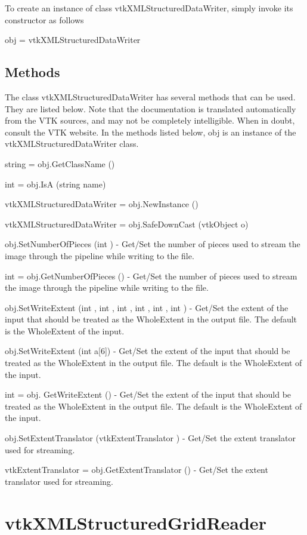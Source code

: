 To create an instance of class vtk\-X\-M\-L\-Structured\-Data\-Writer, simply invoke its constructor as follows \begin{DoxyVerb}  obj = vtkXMLStructuredDataWriter
\end{DoxyVerb}
 \hypertarget{vtkwidgets_vtkxyplotwidget_Methods}{}\subsection{Methods}\label{vtkwidgets_vtkxyplotwidget_Methods}
The class vtk\-X\-M\-L\-Structured\-Data\-Writer has several methods that can be used. They are listed below. Note that the documentation is translated automatically from the V\-T\-K sources, and may not be completely intelligible. When in doubt, consult the V\-T\-K website. In the methods listed below, {\ttfamily obj} is an instance of the vtk\-X\-M\-L\-Structured\-Data\-Writer class. 
\begin{DoxyItemize}
\item {\ttfamily string = obj.\-Get\-Class\-Name ()}  
\item {\ttfamily int = obj.\-Is\-A (string name)}  
\item {\ttfamily vtk\-X\-M\-L\-Structured\-Data\-Writer = obj.\-New\-Instance ()}  
\item {\ttfamily vtk\-X\-M\-L\-Structured\-Data\-Writer = obj.\-Safe\-Down\-Cast (vtk\-Object o)}  
\item {\ttfamily obj.\-Set\-Number\-Of\-Pieces (int )} -\/ Get/\-Set the number of pieces used to stream the image through the pipeline while writing to the file.  
\item {\ttfamily int = obj.\-Get\-Number\-Of\-Pieces ()} -\/ Get/\-Set the number of pieces used to stream the image through the pipeline while writing to the file.  
\item {\ttfamily obj.\-Set\-Write\-Extent (int , int , int , int , int , int )} -\/ Get/\-Set the extent of the input that should be treated as the Whole\-Extent in the output file. The default is the Whole\-Extent of the input.  
\item {\ttfamily obj.\-Set\-Write\-Extent (int a\mbox{[}6\mbox{]})} -\/ Get/\-Set the extent of the input that should be treated as the Whole\-Extent in the output file. The default is the Whole\-Extent of the input.  
\item {\ttfamily int = obj. Get\-Write\-Extent ()} -\/ Get/\-Set the extent of the input that should be treated as the Whole\-Extent in the output file. The default is the Whole\-Extent of the input.  
\item {\ttfamily obj.\-Set\-Extent\-Translator (vtk\-Extent\-Translator )} -\/ Get/\-Set the extent translator used for streaming.  
\item {\ttfamily vtk\-Extent\-Translator = obj.\-Get\-Extent\-Translator ()} -\/ Get/\-Set the extent translator used for streaming.  
\end{DoxyItemize}\hypertarget{vtkio_vtkxmlstructuredgridreader}{}\section{vtk\-X\-M\-L\-Structured\-Grid\-Reader}\label{vtkio_vtkxmlstructuredgridreader}
